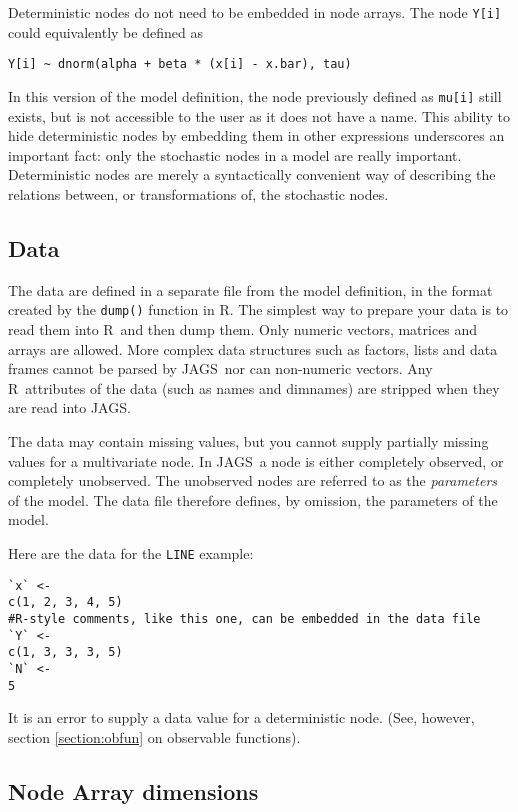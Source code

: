 \documentclass[11pt, a4paper, titlepage]{report}
\newcommand{\JAGS}{\textsf{JAGS}}
\newcommand{\R}{\textsf{R}}
\begin{document}
Deterministic nodes do not need to be embedded in node arrays. The
node \verb+Y[i]+ could equivalently be defined as
\begin{verbatim}
Y[i] ~ dnorm(alpha + beta * (x[i] - x.bar), tau)
\end{verbatim}
In this version of the model definition, the node previously defined
as \verb+mu[i]+ still exists, but is not accessible to the user as it
does not have a name.  This ability to hide deterministic nodes by
embedding them in other expressions underscores an important fact:
only the stochastic nodes in a model are really
important. Deterministic nodes are merely a syntactically convenient
way of describing the relations between, or transformations of, the
stochastic nodes.

\subsection{Data}
\label{section:data}

The data are defined in a separate file from the model definition, in
the format created by the \texttt{dump()} function in \R.  The
simplest way to prepare your data is to read them into \R\ and then
dump them.  Only numeric vectors, matrices and arrays are
allowed. More complex data structures such as factors, lists and data
frames cannot be parsed by \JAGS\, nor can non-numeric vectors.  Any
\R\ attributes of the data (such as names and dimnames) are stripped
when they are read into \JAGS.

The data may contain missing values, but you cannot supply partially
missing values for a multivariate node. In \JAGS\ a node is either
completely observed, or completely unobserved.  The unobserved nodes
are referred to as the {\em parameters} of the model. The data file
therefore defines, by omission, the parameters of the model.

Here are the data for the \verb+LINE+ example:
\begin{verbatim}
`x` <-
c(1, 2, 3, 4, 5)
#R-style comments, like this one, can be embedded in the data file
`Y` <-
c(1, 3, 3, 3, 5)
`N` <-
5
\end{verbatim}

It is an error to supply a data value for a deterministic node. (See, however,
section \ref{section:obfun} on observable functions).

\subsection{Node Array dimensions}
\end{document}
